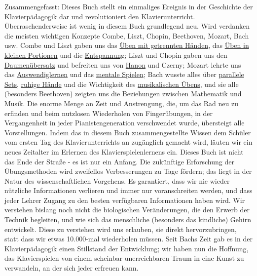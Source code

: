 Zusammengefasst: Dieses Buch stellt ein einmaliges Ereignis in der Geschichte der Klavierpädagogik dar und revolutioniert den Klavierunterricht.
Überraschenderweise ist wenig in diesem Buch grundlegend neu.
Wird verdanken die meisten wichtigen Konzepte Combe, Liszt, Chopin, Beethoven, Mozart, Bach usw.
Combe und Liszt gaben uns das \hyperref[c1ii7]{Üben mit getrennten Händen}, das \hyperref[c1ii6]{Üben in kleinen Portionen} und die \hyperref[c1ii14]{Entspannung};
Liszt und Chopin gaben uns den \hyperref[c1iii5b]{Daumenübersatz} und befreiten uns von \hyperref[c1iii7h]{Hanon} und Czerny;
Mozart lehrte uns das \hyperref[c1iii6]{Auswendiglernen} und das \hyperref[c1ii12mental]{mentale Spielen};
Bach wusste alles über \hyperref[c1ii11]{parallele Sets}, \hyperref[ruhig]{ruhige Hände} und die Wichtigkeit des \hyperref[c1iii14d]{musikalischen Übens},
und sie alle (besonders Beethoven) zeigten uns die Beziehungen zwischen Mathematik und Musik.
Die enorme Menge an Zeit und Anstrengung, die, um das Rad neu zu erfinden und beim nutzlosen Wiederholen von Fingerübungen, in der Vergangenheit in jeder Pianistengeneration verschwendet wurde, übersteigt alle Vorstellungen.
Indem das in diesem Buch zusammengestellte Wissen dem Schüler vom ersten Tag des Klavierunterrichts an zugänglich gemacht wird, läuten wir ein neues Zeitalter im Erlernen des Klavierspielenlernens ein.
Dieses Buch ist nicht das Ende der Straße - es ist nur ein Anfang.
Die zukünftige Erforschung der Übungsmethoden wird zweifellos Verbesserungen zu Tage fördern; das liegt in der Natur des wissenschaftlichen Vorgehens.
Es garantiert, dass wir nie wieder nützliche Informationen verlieren und immer nur voranschreiten werden, und dass jeder Lehrer Zugang zu den besten verfügbaren Informationen haben wird.
Wir verstehen bislang noch nicht die biologischen Veränderungen, die den Erwerb der Technik begleiten, und wie sich das menschliche (besonders das kindliche) Gehirn entwickelt.
Diese zu verstehen wird uns erlauben, sie direkt hervorzubringen, statt dass wir etwas 10.000-mal wiederholen müssen.
Seit Bachs Zeit gab es in der Klavierpädagogik einen Stillstand der Entwicklung; wir haben nun die Hoffnung, das Klavierspielen von einem scheinbar unerreichbaren Traum in eine Kunst zu verwandeln, an der sich jeder erfreuen kann.

